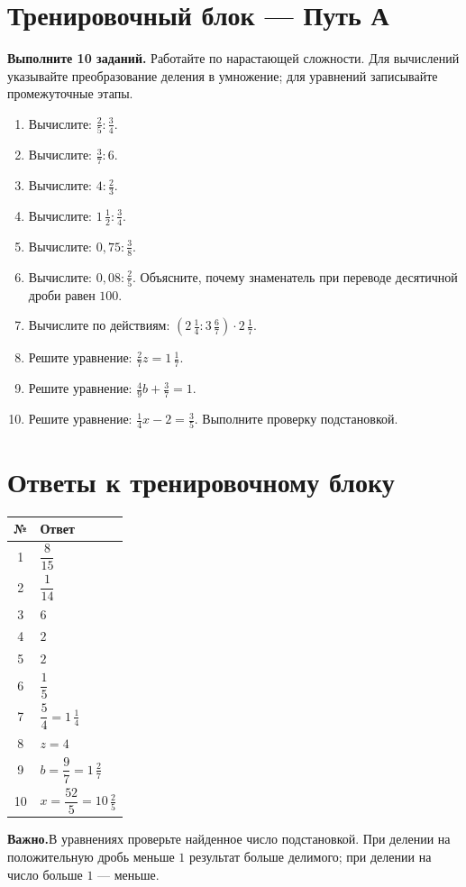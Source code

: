 \documentclass[a4paper,12pt]{article}
\newcommand{\sect}[1]{\section*{\color{darkaccent}#1}}
\newcommand{\remember}[1]{\par\smallskip\noindent\textcolor{darkaccent}{\textbf{Важно.}}\enspace #1\par\smallskip}
\newcommand{\mix}[3]{#1\,\frac{#2}{#3}}
\newcommand{\task}[1]{\item #1\par\vspace{2mm}}
\begin{document}
\clearpage
\sect{Тренировочный блок --- Путь А}
\textbf{Выполните 10 заданий.} Работайте по нарастающей сложности.
Для вычислений указывайте преобразование деления в умножение;
для уравнений записывайте промежуточные этапы.
\begin{enumerate}
\task{Вычислите: $\displaystyle\frac25:\frac34$.}
\task{Вычислите: $\displaystyle\frac37:6$.}
\task{Вычислите: $\displaystyle4:\frac23$.}
\task{Вычислите: $\displaystyle\mix{1}{1}{2}:\frac34$.}
\task{Вычислите: $\displaystyle0{,}75:\frac38$.}
\task{Вычислите: $\displaystyle0{,}08:\frac25$. Объясните, почему знаменатель при переводе десятичной дроби равен $100$.}
\task{Вычислите по действиям:
$\displaystyle\left(\mix{2}{1}{4}:\mix{3}{6}{7}\right)\cdot\mix{2}{1}{7}$.}
\task{Решите уравнение: $\displaystyle\frac27z=\mix{1}{1}{7}$.}
\task{Решите уравнение: $\displaystyle\frac49b+\frac37=1$.}
\task{Решите уравнение: $\displaystyle\frac14x-2=\frac35$. Выполните проверку подстановкой.}
\end{enumerate}

\clearpage
\sect{Ответы к тренировочному блоку}
\vspace{5mm}
\renewcommand{\arraystretch}{1.8}
\begin{center}
\begin{tabularx}{\linewidth}{@{}c>{\raggedright\arraybackslash}X@{}}
\toprule
\textbf{№} & \textbf{Ответ}\\
\midrule
1 & $\dfrac8{15}$\\
2 & $\dfrac1{14}$\\
3 & $6$\\
4 & $2$\\
5 & $2$\\
6 & $\dfrac15$\\
7 & $\dfrac54=\mix{1}{1}{4}$\\
8 & $z=4$\\
9 & $b=\dfrac97=\mix{1}{2}{7}$\\
10 & $x=\dfrac{52}{5}=\mix{10}{2}{5}$\\
\bottomrule
\end{tabularx}
\end{center}
\vspace{8mm}
\remember{В уравнениях проверьте найденное число подстановкой. При делении
на положительную дробь меньше $1$ результат больше делимого;
при делении на число больше $1$ --- меньше.}
\end{document}
